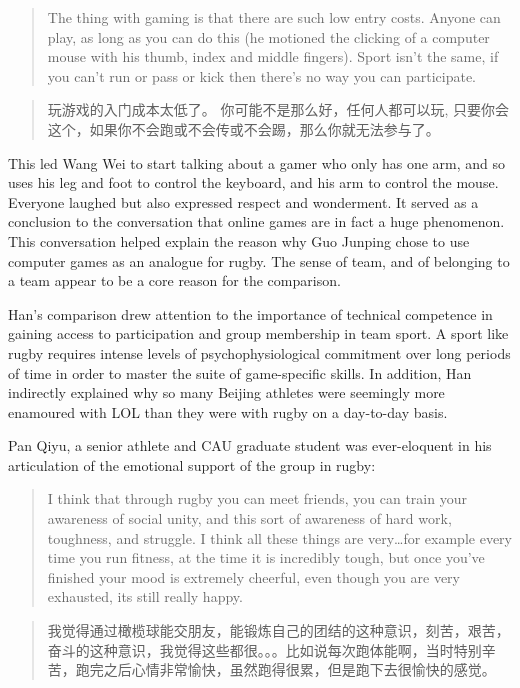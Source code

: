 \begin{CJK}{UTF8}{gbsn}
    \begin{quotation}
          The thing with gaming is that there are such low entry costs.  Anyone can play, as long as you can do this (he motioned the clicking of a computer mouse with his thumb, index and middle fingers).  Sport isn’t the same, if you can’t run or pass or kick then there’s no way you can participate.
    \end{quotation}

    \begin{quotation}
          玩游戏的入门成本太低了。 你可能不是那么好，任何人都可以玩, 只要你会这个，如果你不会跑或不会传或不会踢，那么你就无法参与了。
    \end{quotation}

This led Wang Wei to start talking about a gamer who only has one arm, and so uses his leg and foot to control the keyboard, and his arm to control the mouse.  Everyone laughed but also expressed respect and wonderment.  It served as a conclusion to the conversation that online games are in fact a huge phenomenon.  This conversation helped explain the reason why Guo Junping chose to use computer games as an analogue for rugby.  The sense of team, and of belonging to a team appear to be a core reason for the comparison.

Han's comparison drew attention to the importance of technical competence in gaining access to participation and group membership in team sport.  A sport like rugby requires intense levels of psychophysiological commitment over long periods of time in order to master the suite of game-specific skills.  In addition, Han indirectly explained why so many Beijing athletes were seemingly more enamoured with LOL than they were with rugby on a day-to-day basis.

Pan Qiyu, a senior athlete and CAU graduate student was ever-eloquent in his articulation of the emotional support of the group in rugby:

    \begin{quotation}
      I think that through rugby you can meet friends, you can train your awareness of social unity, and this sort of awareness of hard work, toughness, and struggle. I think all these things are very…for example every time you run fitness, at the time it is incredibly tough, but once you’ve finished your mood is extremely cheerful, even though you are very exhausted, its still really happy.
    \end{quotation}

    \begin{quotation}
      我觉得通过橄榄球能交朋友，能锻炼自己的团结的这种意识，刻苦，艰苦，奋斗的这种意识，我觉得这些都很。。。比如说每次跑体能啊，当时特别辛苦，跑完之后心情非常愉快，虽然跑得很累，但是跑下去很愉快的感觉。 
    \end{quotation}


\end{CJK}
